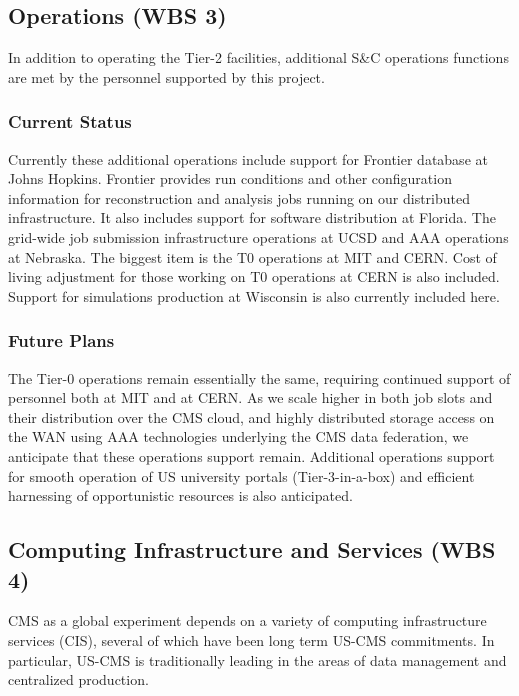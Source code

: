 \documentclass[11pt,a4paper]{article}
\begin{document}
\subsection{Operations (WBS 3)}

In addition to operating the Tier-2 facilities, additional S\&C 
operations functions are met by the personnel supported by this
project.  

\subsubsection{Current Status}

Currently these additional operations include support for Frontier
database at Johns Hopkins.  Frontier provides run conditions and other
configuration information for reconstruction and analysis jobs running
on our distributed infrastructure.  It also includes support for
software distribution at Florida.  The grid-wide job submission
infrastructure operations at UCSD and AAA operations at Nebraska. The
biggest item is the T0 operations at MIT and CERN.  Cost of living
adjustment for those working on T0 operations at CERN is also
included.  Support for simulations production at Wisconsin is also
currently included here.

\subsubsection{Future Plans}

The Tier-0 operations remain essentially the same, requiring continued
support of personnel both at MIT and at CERN.  As we scale higher in
both job slots and their distribution over the CMS cloud, and highly
distributed storage access on the WAN using AAA technologies
underlying the CMS data federation, we anticipate that these
operations support remain.  Additional operations support for smooth
operation of US university portals (Tier-3-in-a-box) and efficient
harnessing of opportunistic resources is also anticipated.

\subsection{Computing Infrastructure and Services (WBS 4)}

CMS as a global experiment depends on a variety of computing infrastructure services (CIS), several of which
have been long term US-CMS commitments. In particular, US-CMS is traditionally leading in the areas
of data management and centralized production. 
\end{document}
